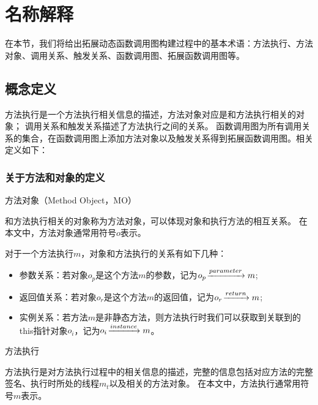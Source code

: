 \chapter{名称解释}
\label{chp:definition}


在本节，我们将给出拓展动态函数调用图构建过程中的基本术语：方法执行、方法对象、调用关系、触发关系、函数调用图、拓展函数调用图等。

\section{概念定义}
方法执行是一个方法执行相关信息的描述，方法对象对应是和方法执行相关的对象；
调用关系和触发关系描述了方法执行之间的关系。
函数调用图为所有调用关系的集合，在函数调用图上添加方法对象以及触发关系得到拓展函数调用图。相关定义如下：

\subsection{关于方法和对象的定义}

\begin{myDef}
	方法对象（Method Object，MO）
\end{myDef}
	和方法执行相关的对象称为方法对象，可以体现对象和执行方法的相互关系。
	在本文中，方法对象通常用符号$o$表示。
	

	对于一个方法执行$m$，对象和方法执行的关系有如下几种：
	\begin{itemize}
		\item 参数关系：若对象$o_p$是这个方法$m$的参数，记为$o_p \joinrel\xrightarrow{parameter} m$;%
		\item 返回值关系：若对象$o_r$是这个方法$m$的返回值，记为$o_r \joinrel\xrightarrow{return} m$;%
		\item 实例关系：若方法$m$是非静态方法，则方法执行时我们可以获取到关联到的this指针对象$o_i$，记为$o_i \joinrel\xrightarrow{instance} m$。%
	\end{itemize}

\begin{myDef}方法执行\end{myDef}

方法执行是对方法执行过程中的相关信息的描述，完整的信息包括对应方法的完整签名、执行时所处的线程$m_t$以及相关的方法对象。
在本文中，方法执行通常用符号$m$表示。

